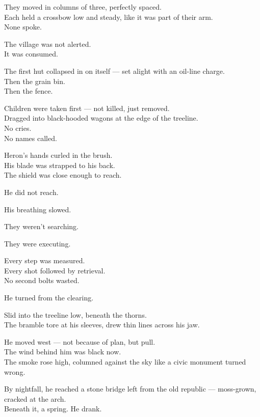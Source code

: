 \documentclass[12pt]{article}
\begin{document}
They moved in columns of three, perfectly spaced.\\
Each held a crossbow low and steady, like it was part of their arm.\\
None spoke.

\vspace{1em}

The village was not alerted.\\
It was consumed.

The first hut collapsed in on itself — set alight with an oil-line charge.\\
Then the grain bin.\\
Then the fence.

Children were taken first — not killed, just removed.\\
Dragged into black-hooded wagons at the edge of the treeline.\\
No cries.\\
No names called.

\vspace{1em}

Heron’s hands curled in the brush.\\
His blade was strapped to his back.\\
The shield was close enough to reach.

He did not reach.

His breathing slowed.

They weren’t searching.

They were executing.

Every step was measured.\\
Every shot followed by retrieval.\\
No second bolts wasted.

\vspace{1em}

He turned from the clearing.

Slid into the treeline low, beneath the thorns.\\
The bramble tore at his sleeves, drew thin lines across his jaw.

He moved west — not because of plan, but pull.\\
The wind behind him was black now.\\
The smoke rose high, columned against the sky like a civic monument turned wrong.

\vspace{1em}

By nightfall, he reached a stone bridge left from the old republic — moss-grown, cracked at the arch.\\
Beneath it, a spring.  
He drank.
\end{document}
